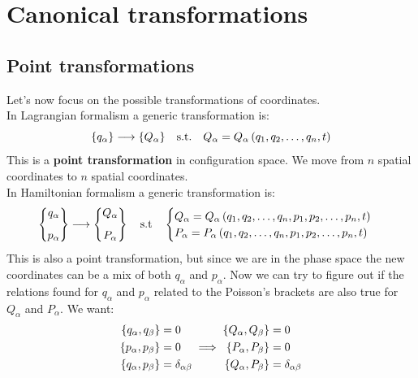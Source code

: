 \chapter{Canonical transformations}
\section{Point transformations}
Let's now focus on the possible transformations of coordinates.\\
In Lagrangian formalism a generic transformation is:
\begin{equation}
    \{q_{\alpha}\} \longrightarrow \{Q_{\alpha}\}\quad \text{s.t.}\quad Q_{\alpha} = Q_{\alpha}\left(q_1,q_2,\dots,q_n,t\right)
\end{equation}
This is a \textbf{point transformation} in configuration space. We move from $n$ spatial coordinates to $n$ spatial coordinates.\\
In Hamiltonian formalism a generic transformation is:
\begin{equation}
    \begin{Bmatrix}
        q_{\alpha}\\[8pt]
        p_{\alpha}
    \end{Bmatrix} \longrightarrow
    \begin{Bmatrix}
        Q_{\alpha}\\[8pt]
        P_{\alpha}
    \end{Bmatrix}\quad \text{s.t} \quad
    \begin{cases}
        Q_{\alpha} = Q_{\alpha}\left(q_1,q_2,\dots,q_n,p_1,p_2,\dots,p_n,t\right)\\
        P_{\alpha} = P_{\alpha}\left(q_1,q_2,\dots,q_n,p_1,p_2,\dots,p_n,t\right)
    \end{cases}
\end{equation}
This is also a point transformation, but since we are in the phase space the new coordinates can be a mix of both $q_{\alpha}$ and $p_{\alpha}$. Now we can try to figure out if the relations found for $q_{\alpha}$ and $p_{\alpha}$ related to the Poisson's brackets are also true for $Q_{\alpha}$ and $P_{\alpha}$.
We want:
\begin{equation}
    \begin{split}
        \pb{q_{\alpha}}{q_{\beta}} &= 0\\
        \pb{p_{\alpha}}{p_{\beta}} &= 0\\
        \pb{q_{\alpha}}{p_{\beta}} &= \delta_{\alpha \beta}
    \end{split} \implies
    \begin{split}
        \pb{Q_{\alpha}}{Q_{\beta}} &= 0\\
        \pb{P_{\alpha}}{P_{\beta}} &= 0\\
        \pb{Q_{\alpha}}{P_{\beta}} &= \delta_{\alpha \beta}
    \end{split}
\end{equation}
